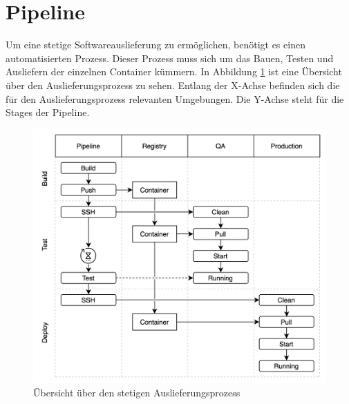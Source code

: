 \section{Pipeline}
\label{sec:pipeline}
Um eine stetige Softwareauslieferung zu ermöglichen, benötigt es einen automatisierten
Prozess. Dieser Prozess muss sich um das Bauen, Testen und Ausliefern der einzelnen
Container kümmern. In Abbildung \ref{figure:uebersichtueberdenstetigenauslieferungsprozess}
ist eine Übersicht über den Auslieferungsprozess zu sehen. Entlang der X-Achse
befinden sich die für den Auslieferungsprozess relevanten Umgebungen.
Die Y-Achse steht für die Stages der Pipeline.

\begin{figure}
    \begin{center}
    \includegraphics[scale=0.2]{img/abbildungen/Pipeline}
    \end{center}
    \caption{Übersicht über den stetigen Auslieferungsprozess}
    \label{figure:uebersichtueberdenstetigenauslieferungsprozess}
\end{figure}


